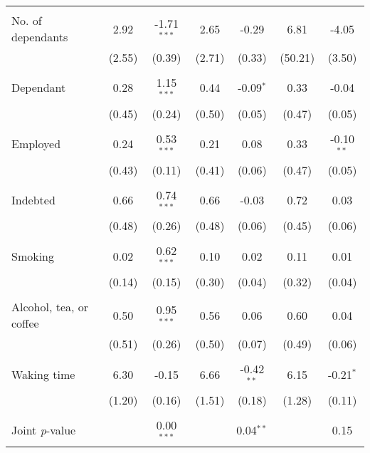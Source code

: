 \begin{table}[htbp]
{\begin{threeparttable}
\begin{tabular}{l*{6}{c}}
          &         &         &         &         &         &         \\
No. of dependants&     2.92&-1.71$^{***}$&     2.65&    -0.29&     6.81&    -4.05\\
          &   (2.55)&   (0.39)&   (2.71)&   (0.33)&  (50.21)&   (3.50)\\
          &         &         &         &         &         &         \\
Dependant &     0.28&1.15$^{***}$&     0.44&-0.09$^{*}$&     0.33&    -0.04\\
          &   (0.45)&   (0.24)&   (0.50)&   (0.05)&   (0.47)&   (0.05)\\
          &         &         &         &         &         &         \\
Employed  &     0.24&0.53$^{***}$&     0.21&     0.08&     0.33&-0.10$^{**}$\\
          &   (0.43)&   (0.11)&   (0.41)&   (0.06)&   (0.47)&   (0.05)\\
          &         &         &         &         &         &         \\
Indebted  &     0.66&0.74$^{***}$&     0.66&    -0.03&     0.72&     0.03\\
          &   (0.48)&   (0.26)&   (0.48)&   (0.06)&   (0.45)&   (0.06)\\
          &         &         &         &         &         &         \\
Smoking   &     0.02&0.62$^{***}$&     0.10&     0.02&     0.11&     0.01\\
          &   (0.14)&   (0.15)&   (0.30)&   (0.04)&   (0.32)&   (0.04)\\
          &         &         &         &         &         &         \\
Alcohol, tea, or coffee&     0.50&0.95$^{***}$&     0.56&     0.06&     0.60&     0.04\\
          &   (0.51)&   (0.26)&   (0.50)&   (0.07)&   (0.49)&   (0.06)\\
          &         &         &         &         &         &         \\
Waking time&     6.30&    -0.15&     6.66&-0.42$^{**}$&     6.15&-0.21$^{*}$\\
          &   (1.20)&   (0.16)&   (1.51)&   (0.18)&   (1.28)&   (0.11)\\
          &         &         &         &         &         &         \\
\midrule Joint \emph{p}-value&         &0.00$^{***}$&         &0.04$^{**}$&         &     0.15\\

\end{tabular}
\end{threeparttable}}
\end{table}
